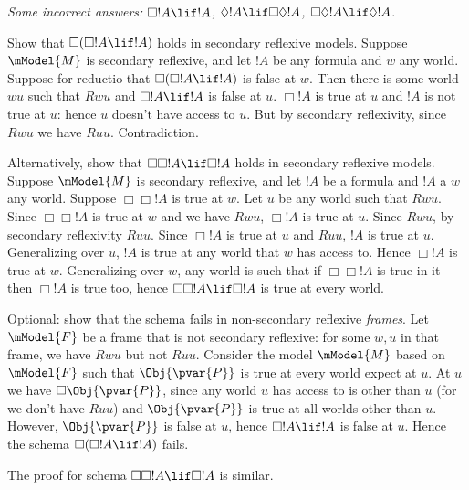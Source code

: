 \documentclass[../../../include/open-logic-section]{subfiles}
\begin{document}
\begin{prob}
\begin{ans}
\begin{enumerate}
    \emph{Some \emph{incorrect} answers: $\Box!A\lif!A$,
    $\Diamond!A\lif\Box\Diamond!A$, $\Box\Diamond!A\lif\Diamond!A$.}

    Show that $\Box(\Box!A\lif!A)$ holds in secondary reflexive
    models. Suppose $\mModel{M}$ is secondary reflexive, and let $!A$ be
    any formula and $w$ any world. Suppose for reductio that
    $\Box(\Box!A\lif!A)$ is false at $w$. Then there is some world
    $wu$ such that $Rwu$ and $\Box!A\lif!A$ is false at $u$. $\Box!A$
    is true at $u$ and $!A$ is not true at $u$: hence $u$ doesn't have
    access to $u$. But by secondary reflexivity, since $Rwu$ we have
    $Ruu$. Contradiction. 

    Alternatively, show that  $\Box\Box!A\lif \Box!A$ holds in secondary reflexive
    models. Suppose $\mModel{M}$ is secondary reflexive, and let $!A$
    be a formula and $!A$ a $w$ any world. Suppose $\Box\Box!A$ is true
    at $w$. Let $u$ be any world such that $Rwu$. Since  $\Box\Box!A$ is true
    at $w$ and we have $Rwu$, $\Box!A$ is true at $u$. Since $Rwu$,
    by secondary reflexivity $Ruu$. Since $\Box!A$ is true at $u$
    and $Ruu$, $!A$ is true at $u$. Generalizing over $u$, 
    $!A$ is true at any world that $w$ has access to. Hence
    $\Box!A$ is true at $w$. Generalizing over $w$, any world 
    is such that if $\Box\Box!A$ is true in it then $\Box!A$ 
    is true too, hence $\Box\Box!A\lif \Box!A$ is true at 
    every world.

    Optional: show that the schema fails in non-secondary
    reflexive \emph{frames}. Let $\mModel{F}$ be a frame 
    that is not secondary reflexive: for some $w,u$ in 
    that frame, we have $Rwu$ but not $Ruu$. Consider the model 
    $\mModel{M}$ based on $\mModel{F}$ such that $\Obj{\pvar{P}}$
    is true at every world expect at $u$. At $u$ we have 
    $\Box\Obj{\pvar{P}}$, since any world $u$ has access to 
    is other than $u$ (for we don't have $Ruu$) and $\Obj{\pvar{P}}$
    is true at all worlds other than $u$. However, $\Obj{\pvar{P}}$ 
    is false at $u$, hence $\Box!A\lif!A$ is false at $u$. 
    Hence the schema $\Box(\Box!A\lif!A)$ fails. 
    
    The proof for schema $\Box\Box!A\lif \Box!A$ is similar.

    \end{enumerate}

    \clearpage
    \end{ans}
    
\end{prob}
\end{document}
